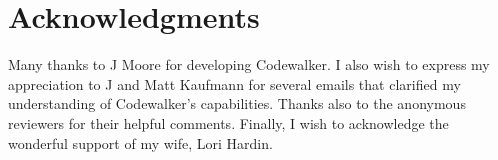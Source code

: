 \documentclass{eptcs}
\begin{document}
\section{Acknowledgments}

Many thanks to J Moore for developing Codewalker.  I also wish 
to express my appreciation to  J and Matt Kaufmann for several 
emails that clarified my understanding of Codewalker's capabilities.  
Thanks also to the anonymous reviewers for their helpful comments.
Finally, I wish to acknowledge the wonderful support of my wife, Lori Hardin.



\end{document}
